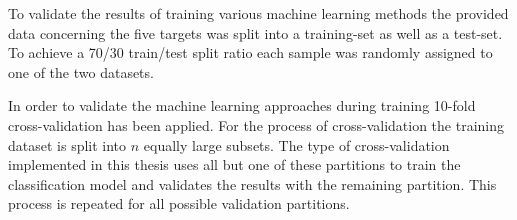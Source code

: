 To validate the results of training various machine learning methods the provided data concerning
the five targets was split into a training-set as well as a test-set. To achieve a 70/30 train/test split ratio each sample was randomly assigned 
to one of the two datasets\cite[]{Xu2018}.

In order to validate the machine learning approaches during training 10-fold cross-validation has been applied.
For the process of cross-validation the training dataset is split into $n$ equally large subsets.
The type of cross-validation implemented in this thesis uses all but one of these partitions to train the classification model and validates the 
results with the remaining partition. This process is repeated for all possible validation partitions\cite[]{Molinaro2005}.